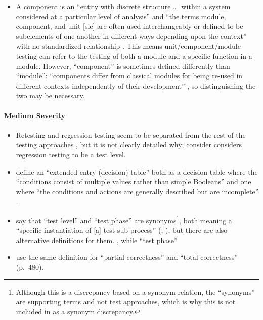\begin{itemize}
\begin{itemize}
            \end{itemize}
      \item A component is an ``entity with discrete structure \dots\ within a
            system considered at a particular level of analysis''
            \citep{ISO_IEC2023b} and ``the terms module, component, and unit
                  [sic] are often used interchangeably or defined to be subelements
            of one another in different ways depending upon the context'' with
            no standardized relationship \citep[p.~82]{IEEE2017}. This means
            unit/component/module testing can refer to the testing of both a
            module and a specific function in a module.
            However, ``component'' is sometimes defined differently than
            ``module'': ``components differ from classical modules for being
            re-used in different contexts independently of their development''
            \citep[p.~107]{BaresiAndPezzè2006}, so distinguishing the two
            may be necessary.
            \ifnotpaper
\end{itemize}

\paragraph{Medium Severity}
\begin{itemize}\fi
      \item Retesting and regression testing seem to be separated from the rest
            of the testing approaches \citep[p.~23]{IEEE2022}, but it is not
            clearly detailed why; \citet[p.~3]{BarbosaEtAl2006} \ifnotpaper
                  consider \else considers \fi regression testing to be a test level.
            \ifnotpaper
      \item \citeauthor{IEEE2021} define an ``extended entry (decision) table''
            both as a decision table where the ``conditions consist of multiple
            values rather than simple Booleans'' \citeyearpar[p.~18]{IEEE2021}
            and one where ``the conditions and actions are generally described
            but are incomplete'' \citeyearpar[p.~175]{IEEE2017}.
      \item \citeauthor*{IEEE2017} say that ``test level'' and ``test phase''
            are synonyms\footnote{Although this is a discrepancy based on a
                  synonym relation, the ``synonyms'' are supporting terms and
                  not test approaches, which is why this is not included in
                   as a synonym discrepancy.}, both meaning a
            ``specific instantiation of [a] test sub-process''
            (\citeyear[pp.~469,~470]{IEEE2017}; \citeyear[p.~9]{IEEE2013}), but
            there are also alternative definitions for them.
            \procLevel{\citeyearpar}, while ``test phase'' \phaseDef{}
      \item \citeauthor{IEEE2017} use the same definition for ``partial correctness''
            \citeyearpar[p.~314]{IEEE2017} and ``total correctness'' (p.~480).
            \fi
\end{itemize}

